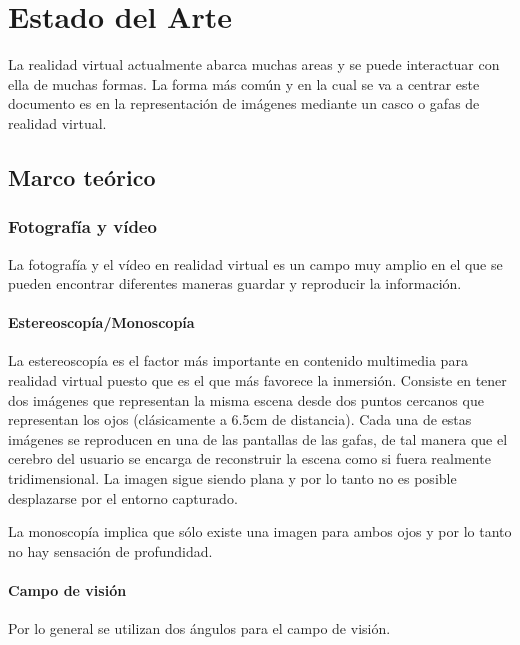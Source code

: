 
\pagestyle{empty}
\chapter {Estado del Arte}

La realidad virtual actualmente abarca muchas areas y se puede interactuar con ella de muchas formas. La forma más común y en la cual se va a centrar este documento es en la representación de imágenes mediante un casco o gafas de realidad virtual.

\section{Marco teórico}

\subsection{Fotografía y vídeo}
La fotografía y el vídeo en realidad virtual es un campo muy amplio en el que se pueden encontrar diferentes maneras guardar y reproducir la información.

\subsubsection{Estereoscopía/Monoscopía}
La estereoscopía es el factor más importante en contenido multimedia para realidad virtual puesto que es el que más favorece la inmersión. Consiste en tener dos imágenes que representan la misma escena desde dos puntos cercanos que representan los ojos (clásicamente a 6.5cm de distancia). Cada una de estas imágenes se reproducen en una de las pantallas de las gafas, de tal manera que el cerebro del usuario se encarga de reconstruir la escena como si fuera realmente tridimensional. La imagen sigue siendo plana y por lo tanto no es posible desplazarse por el entorno capturado.

La monoscopía implica que sólo existe una imagen para ambos ojos y por lo tanto no hay sensación de profundidad.

\subsubsection{Campo de visión}
Por lo general se utilizan dos ángulos para el campo de visión. 

